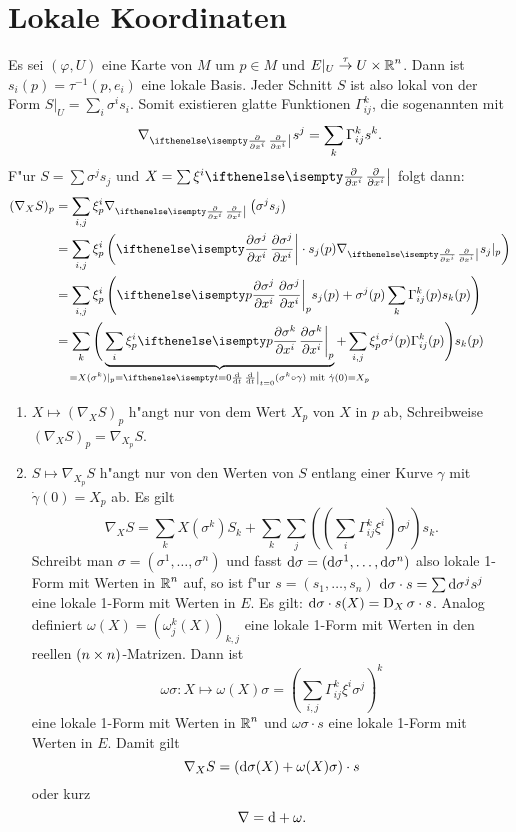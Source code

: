 \section{Lokale Koordinaten}

Es sei $(\varphi, U)$ eine Karte von $M$ um $p \in M$ und $E|_U \overset{\tau}{\to} U \times \operatorname{\mathbb{R}}^n$. Dann ist $s_i(p) = \tau^{-1}(p, e_i)$ eine lokale Basis. Jeder Schnitt $S$ ist also lokal von der Form $S|_U = \sum_i \sigma^{i} s_i$. Somit existieren glatte Funktionen $\Gamma_{ij}^k$, die sogenannten  mit 
	\[ \nabla_{\pdifffrac{}{x^{i}}} s^j = \sum_k \Gamma_{ij}^k s^k. \]
F"ur $S = \sum \sigma^j s_j$ und $X = \sum \xi^{i} \pdifffrac{}{x^{i}}$ folgt dann:
\begin{align*}
	(\nabla_XS)_p &= \sum_{i,j} \xi_p^{i} \nabla_{\pdifffrac{}{x^{i}}} \left(\sigma^j s_j\right)\\
	&= \sum_{i,j} \xi_p^{i} \left(\pdifffrac{\sigma^j}{x^{i}} \cdot s_j(p) \nabla_{\pdifffrac{}{x^{i}}} s_j|_p\right)\\
	&= \sum_{i,j} \xi_p^{i} \left(\pdifffrac[p]{\sigma^j}{x^{i}} s_j(p) + \sigma^j(p) \sum_k \Gamma_{ij}^k(p) s_k(p)\right)\\
	&= \sum_k \Bigg(\underbrace{\sum_i \xi_p^{i} \pdifffrac[p]{\sigma^k}{x^{i}}}_{\mathclap{= X(\sigma^k)|_p = \difffrac[t=0]{}{t} (\sigma^k \circ \gamma) \text{ mit } \dot\gamma(0) = X_p}} + \sum_{i,j} \xi_p^{i} \sigma^j(p) \Gamma_{ij}^k(p)\Bigg) s_k(p)
\end{align*}

\begin{bem}\begin{enumerate}[label=\arabic*),leftmargin=*]
\item
	$X \mapsto (\nabla_XS)_p$ h"angt nur von dem Wert $X_p$ von  $X$ in $p$ ab, Schreibweise $(\nabla_XS)_p = \nabla_{X_p}S$.
\item
	$S \mapsto \nabla_{X_p}S$ h"angt nur von den Werten von $S$ entlang einer Kurve $\gamma$ mit $\dot\gamma(0) = X_p$ ab. Es gilt
		\[ \nabla_XS = \sum_k X(\sigma^k)S_k + \sum_k \sum_j\left(\left(\sum_i \Gamma_{ij}^k \xi^{i}\right) \sigma^j\right) s_k. \]
	Schreibt man $\sigma = (\sigma^1,\ldots ,\sigma^n)$ und fasst $\mathrm{d} \sigma = (\mathrm{d} \sigma^1,\ldots ,\mathrm{d} \sigma^n)$ also lokale 1-Form mit Werten in $\operatorname{\mathbb{R}}^n$ auf, so ist f"ur $s=(s_1,\ldots ,s_n)$ $\mathrm{d}\sigma \cdot s = \sum \mathrm{d} \sigma^j s^j$ eine lokale 1-Form mit Werten in $E$. Es gilt: $\mathrm{d} \sigma \cdot s(X) = \operatorname{D}_X \sigma \cdot s$. Analog definiert $\omega(X) = (\omega_j^k(X))_{k,j}$ eine lokale 1-Form mit Werten in den reellen $(n\times n)$-Matrizen. Dann ist 
	\[ \omega \sigma : X \mapsto \omega(X) \sigma = \left( \sum_{i,j} \Gamma_{ij}^k \xi^{i} \sigma^j \right)^k \]
eine lokale 1-Form mit Werten in $\operatorname{\mathbb{R}}^n$ und $\omega\sigma \cdot s$ eine lokale 1-Form mit Werten in $E$. Damit gilt
	\[ \nabla_XS = (\mathrm{d} \sigma(X) + \omega(X) \sigma) \cdot s \]
oder kurz
	\[ \nabla = \mathrm{d} + \omega. \]
\end{enumerate}\end{bem}

